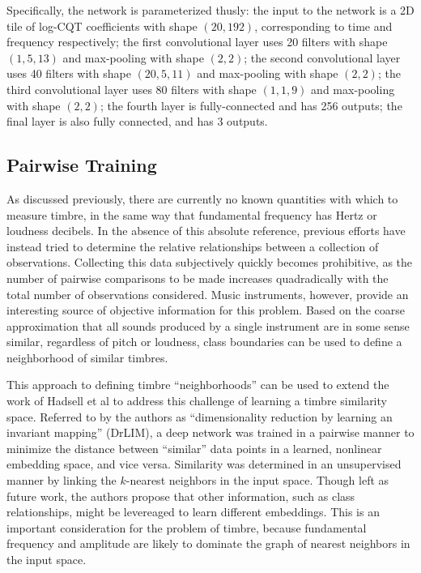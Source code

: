 Specifically, the network is parameterized thusly: the input to the network is a
2D tile of log-CQT coefficients with shape $(20, 192)$, corresponding to time
and frequency respectively; the first convolutional layer uses 20 filters with
shape $(1, 5, 13)$ and max-pooling with shape $(2, 2)$; the second convolutional
layer uses 40 filters with shape $(20, 5, 11)$ and max-pooling with shape $(2,
2)$; the third convolutional layer uses 80 filters with shape $(1, 1, 9)$ and
max-pooling with shape $(2, 2)$; the fourth layer is fully-connected and has 256
outputs; the final layer is also fully connected, and has 3 outputs.


\subsection{Pairwise Training}
\label{subsec:timbre_pairwise}

As discussed previously, there are currently no known quantities with which to measure timbre, in the same way that fundamental frequency has Hertz or loudness decibels.
In the absence of this absolute reference, previous efforts have instead tried to determine the relative relationships between a collection of observations.
Collecting this data subjectively quickly becomes prohibitive, as the number of pairwise comparisons to be made increases quadradically with the total number of observations considered.
Music instruments, however, provide an interesting source of objective information for this problem.
Based on the coarse approximation that all sounds produced by a single instrument are in some sense similar, regardless of pitch or loudness, class boundaries can be used to define a neighborhood of similar timbres.

This approach to defining timbre ``neighborhoods'' can be used to extend the work of Hadsell et al \cite{Hadsell2007} to address this challenge of learning a timbre similarity space.
Referred to by the authors as ``dimensionality reduction by learning an invariant mapping'' (DrLIM), a deep network was trained in a pairwise manner to minimize the distance between ``similar'' data points in a learned, nonlinear embedding space, and vice versa.
Similarity was determined in an unsupervised manner by linking the $k$-nearest neighbors in the input space.
Though left as future work, the authors propose that other information, such as class relationships, might be levereaged to learn different embeddings.
This is an important consideration for the problem of timbre, because fundamental frequency and amplitude are likely to dominate the graph of nearest neighbors in the input space.

